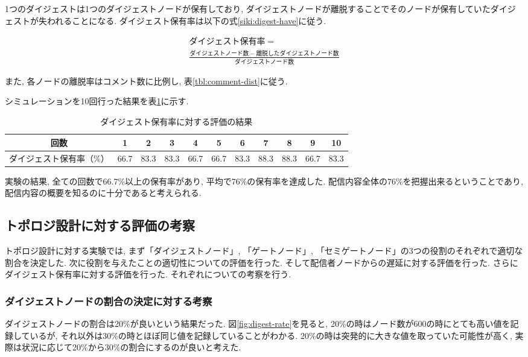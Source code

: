 1つのダイジェストは1つのダイジェストノードが保有しており, ダイジェストノードが離脱することでそのノードが保有していたダイジェストが失われることになる. ダイジェスト保有率は以下の式\ref{siki:digest-have}に従う.

\begin{eqnarray}
        ダイジェスト保有率 = \nonumber \\
        \frac{ダイジェストノード数 - 離脱したダイジェストノード数}{ダイジェストノード数}
        \label{siki:digest-have}
\end{eqnarray}

また, 各ノードの離脱率はコメント数に比例し, 表\ref{tbl:comment-dist}に従う.

シミュレーションを10回行った結果を表\ref{tbl:digest-have-res}に示す.

\begin{table}[h]
  \caption{ダイジェスト保有率に対する評価の結果}
  \label{tbl:digest-have-res}
  \centering
      {\small
        \begin{tabular}{|c||c|c|c|c|c|c|c|c|c|c|} \hline
        回数 & 1 & 2 & 3 & 4 & 5 & 6 & 7 & 8 & 9 & 10 \\ \hline
        ダイジェスト保有率（\%） & 66.7 & 83.3 & 83.3 & 66.7 & 66.7 & 83.3 & 88.3 & 88.3 & 66.7 & 83.3 \\ \hline
        \end{tabular}
      }
\end{table}

実験の結果, 全ての回数で66.7\%以上の保有率があり, 平均で76\%の保有率を達成した. 配信内容全体の76\%を把握出来るということであり, 配信内容の概要を知るのに十分であると考えられる.

\subsection{トポロジ設計に対する評価の考察}
トポロジ設計に対する実験では, まず「ダイジェストノード」, 「ゲートノード」, 「セミゲートノード」の3つの役割のそれぞれで適切な割合を決定した. 次に役割を与えたことの適切性についての評価を行った. そして配信者ノードからの遅延に対する評価を行った. さらにダイジェスト保有率に対する評価を行った. それぞれについての考察を行う.

\subsubsection{ダイジェストノードの割合の決定に対する考察}
ダイジェストノードの割合は20\%が良いという結果だった. 図\ref{fig:digest-rate}を見ると, 20\%の時はノード数が600の時にとても高い値を記録しているが, それ以外は30\%の時とほぼ同じ値を記録していることがわかる. 20\%の時は突発的に大きな値を取っていた可能性が高く, 実際は状況に応じて20\%から30\%の割合にするのが良いと考えた.

